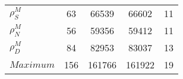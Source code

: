 \begin{center}
\begin{longtable}{lcccc}
$ {\rho^{M}_{S}}       $	 & 	                   63	 & 	                66539	 & 	                66602	 & 	                   11 \\ 
$ {\rho^{M}_{N}}       $	 & 	                   56	 & 	                59356	 & 	                59412	 & 	                   11 \\ 
$ {\rho^{M}_{D}}       $	 & 	                   84	 & 	                82953	 & 	                83037	 & 	                   13 \\ 
$Maximum               $	 & 	                  156	 & 	               161766	 & 	               161922	 & 	                   19 \\ 
\end{longtable}
 \end{center}
